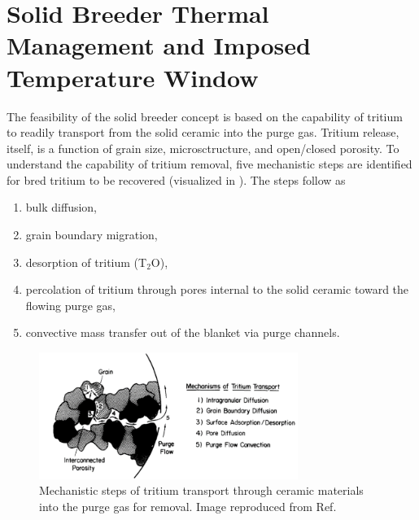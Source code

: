 \section{Solid Breeder Thermal Management and Imposed Temperature Window}

The feasibility of the solid breeder concept is based on the capability of tritium to readily transport from the solid ceramic into the purge gas. Tritium release, itself, is a function of grain size, microsctructure, and open/closed porosity. To understand the capability of tritium removal, five mechanistic steps are identified for bred tritium to be recovered (visualized in ). The steps follow as\cite{Clemmer1980}
\begin{enumerate}
\item bulk diffusion,
\item grain boundary migration,
\item desorption of tritium (T$_2$O),
\item percolation of tritium through pores internal to the solid ceramic toward the flowing purge gas,
\item convective mass transfer out of the blanket via purge channels.
\end{enumerate}

\begin{figure}[ht]
	\centering
	\includegraphics[width=0.75\textwidth]{figures/mechanisms_tritium_transport} 
	\caption{Mechanistic steps of tritium transport through ceramic materials into the purge gas for removal. Image reproduced from Ref.\cite{hastings1989fabrication}}
	\label{fig:mechanisms_tritium_transport}
\end{figure}

